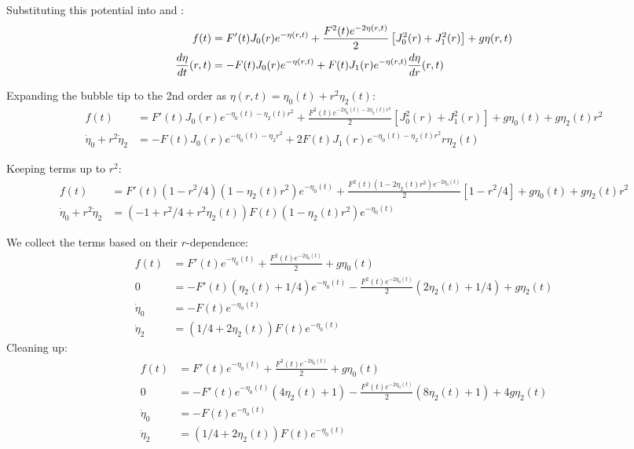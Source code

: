 Substituting this potential into  and :
\begin{align}
f(t) &= F'(t) J_0(r) e^{-\eta(r,t)} + \frac{F^2(t) e^{-2\eta(r,t)}}{2} \left[ J_0^2(r)  + J_1^2(r) \right] + g \eta(r,t) \\
\frac{d \eta}{d t}(r,t) &=  -F(t) J_0(r)e^{-\eta(r,t)}  + F(t) J_1(r) e^{-\eta(r,t)} \frac{d \eta}{d r}(r,t)
\end{align}

Expanding the bubble tip to the 2nd order as $\eta(r,t) = \eta_0(t) + r^2 \eta_2(t)$:
\begin{align}
f(t) &= F'(t) J_0(r) e^{-\eta_0(t)-\eta_2(t)r^2} + \frac{F^2(t) e^{-2\eta_0(t)-2\eta_2(t)r^2}}{2} \left[ J_0^2(r)  + J_1^2(r) \right] + g \eta_0(t) + g \eta_2(t)r^2 \\
\dot\eta_0 + r^2 \dot\eta_2 &=  -F(t) J_0(r)e^{-\eta_0(t) - \eta_2 r^2}  + 2 F(t) J_1(r) e^{-\eta_0(t) - \eta_2(t)r^2} r \eta_2(t) 
\end{align}

Keeping terms up to $r^2$:
\begin{align}
f(t) &= F'(t) \left(1-r^2/4\right) (1-\eta_2(t)r^2) e^{-\eta_0(t)} + \frac{F^2(t) (1-2\eta_2(t)r^2) e^{-2\eta_0(t)}}{2} \left[1-r^2/4\right] + g \eta_0(t) + g \eta_2(t)r^2 \\
\dot\eta_0 + r^2 \dot\eta_2 &= (-1+r^2/4 + r^2 \eta_2(t)) F(t) (1-\eta_2(t)r^2) e^{-\eta_0(t)} 
\end{align}

We collect the terms based on their $r$-dependence:
\begin{align}
f(t) &= F'(t) e^{-\eta_0(t)} + \frac{F^2(t) e^{-2\eta_0(t)}}{2} + g \eta_0(t)  \\
0 &= - F'(t)(\eta_2(t)+ 1/4) e^{-\eta_0(t)} - \frac{F^2(t) e^{-2\eta_0(t)}}{2}(2\eta_2(t)+1/4) + g \eta_2(t) \\
\dot\eta_0  &= - F(t)  e^{-\eta_0(t)}  \\
\dot\eta_2 &= (1/4 + 2\eta_2(t)) F(t)  e^{-\eta_0(t)} 
\end{align}
Cleaning up:
\begin{align}
f(t) &= F'(t) e^{-\eta_0(t)} + \frac{F^2(t) e^{-2\eta_0(t)}}{2} + g \eta_0(t)  \\
0 &= - F'(t) e^{-\eta_0(t)} (4\eta_2(t)+ 1)- \frac{F^2(t) e^{-2\eta_0(t)}}{2}(8\eta_2(t)+1) + 4g \eta_2(t) \\
\dot\eta_0  &= - F(t)  e^{-\eta_0(t)}  \\
\dot\eta_2 &= (1/4 + 2\eta_2(t)) F(t)  e^{-\eta_0(t)} 
\end{align}

